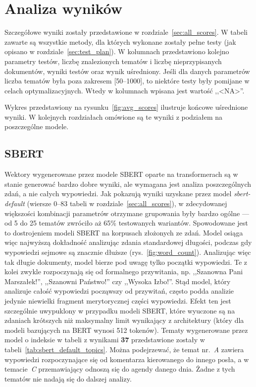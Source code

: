 
\chapter{Analiza wyników}
	Szczegółowe wyniki zostały przedstawione w rozdziale~\ref{sec:all_scores}.
	W tabeli zawarte są wszystkie metody, dla których wykonane zostały pełne testy (jak opisano w rozdziale~\ref{sec:test_plan}).
	W kolumnach przedstawiono kolejno parametry testów, liczbę znalezionych tematów i liczbę nieprzypisanych dokumentów, wyniki testów oraz wynik uśredniony.
	Jeśli dla danych parametrów liczba tematów była poza zakresem [50--1000], to niektóre testy były pomijane w celach optymalizacyjnych.
	Wtedy w kolumnach wpisana jest wartość ,,<NA>''.

	Wykres przedstawiony na rysunku~\ref{fig:avg_scores} ilustruje końcowe uśrednione wyniki.
	W kolejnych rozdziałach omówione są te wyniki z podziałem na poszczególne modele.

\section{SBERT}
	Wektory wygenerowane przez modele SBERT oparte na transformerach są w stanie generować bardzo dobre wyniki,
		ale wymagana jest analiza poszczególnych zdań, a nie całych wypowiedzi.
	Jak pokazują wyniki uzyskane przez model \emph{sbert-default} (wiersze 0--83 tabeli w rozdziale~\ref{sec:all_scores}),
		w zdecydowanej większości kombinacji parametrów otrzymane grupowania były bardzo ogólne --- od 5 do 25 tematów zwróciło aż 65\% testowanych wariantów.
	Spowodowane jest to dostrojeniem modeli SBERT na korpusach złożonych ze zdań.
	Model osiąga więc najwyższą dokładność analizując zdania standardowej długości, podczas gdy wypowiedzi sejmowe są znacznie dłuższe (rys.~\ref{fig:word_count}).
	Analizując więc tak długie dokumenty, model bierze pod uwagę tylko początki wypowiedzi.
	Te z kolei zwykle rozpoczynają się od formalnego przywitania, np. ,,Szanowna Pani Marszałek!'', ,,Szanowni Państwo!'' czy ,,Wysoka Izbo!''.
	Stąd model, który analizuje całość wypowiedzi począwszy od przywitań, często podda analizie jedynie niewielki fragment merytorycznej części wypowiedzi.
	Efekt ten jest szczególnie uwypuklony w przypadku modeli SBERT, które wyuczone są na zdaniach krótszych niż maksymalny limit wynikający z architektury
		(który dla modeli bazujących na BERT wynosi 512 tokenów).
	Tematy wygenerowane przez model o indeksie w tabeli z wynikami \textbf{37} przedstawione zostały w tabeli~\ref{tab:sbert_default_topics}.
	Można podejrzewać, że temat nr.~\emph{A} zawiera wypowiedzi rozpoczynające się od komentarza kierowanego do innego posła, a w temacie~\emph{C} przemawiający odnoszą się do agendy danego dnia.
	Żadne z tych tematów nie nadają się do dalszej analizy.

